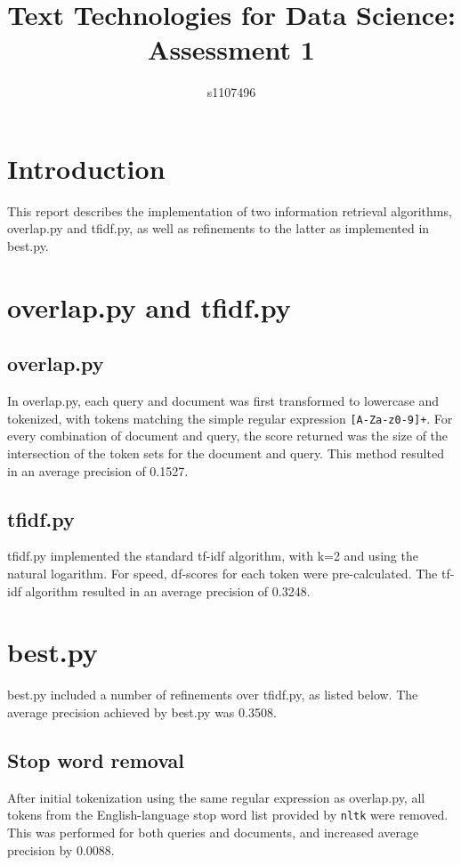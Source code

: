 \documentclass{article}
\begin{document}
\title{Text Technologies for Data Science: Assessment 1}
\author{s1107496}

\maketitle

\section{Introduction}
This report describes the implementation of two information retrieval algorithms, overlap.py and tfidf.py, as well as refinements to the latter as implemented in best.py.

\section{overlap.py and tfidf.py}
\subsection{overlap.py}
In overlap.py, each query and document was first transformed to lowercase and tokenized, with tokens matching the simple regular expression \texttt{[A-Za-z0-9]+}. For every combination of document and query, the score returned was the size of the intersection of the token sets for the document and query. This method resulted in an average precision of 0.1527.
\subsection{tfidf.py}
tfidf.py implemented the standard tf-idf algorithm, with k=2 and using the natural logarithm. For speed, df-scores for each token were pre-calculated. The tf-idf algorithm resulted in an average precision of 0.3248.

\section{best.py}
best.py included a number of refinements over tfidf.py, as listed below. The average precision achieved by best.py was 0.3508.
\subsection{Stop word removal}
After initial tokenization using the same regular expression as overlap.py, all tokens from the English-language stop word list provided by \texttt{nltk} were removed. This was performed for both queries and documents, and increased average precision by 0.0088.
\end{document}
